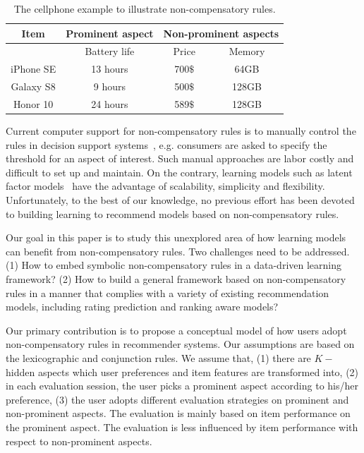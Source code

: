 \documentclass[letterpaper]{article} %
\begin{document}
\begin{table}[htp]
\tiny
\caption{The cellphone example to illustrate non-compensatory rules.}
\begin{center}
\begin{tabular}{|c|c|c|c|}
\hline
Item & Prominent aspect & \multicolumn{2}{|c|}{Non-prominent aspects}\\\hline
& Battery life &  Price & Memory \\\hline
iPhone SE &  13 hours & 700$\$$ & 64GB  \\\hline
Galaxy S8 & 9 hours& 500$\$$  & 128GB \\\hline
Honor 10 & 24 hours& 589$\$$ & 128GB \\\hline
\end{tabular}
\end{center}
\label{tab:example}
\end{table}

Current computer support for non-compensatory rules is to manually control the rules in decision support systems~\cite{Lee2009Transforming}, e.g. consumers are asked to specify the threshold for an aspect of interest. Such manual approaches are labor costly and difficult to set up and maintain. On the contrary, learning models such as latent factor models~\cite{Koren2009Matrix} have the advantage of scalability, simplicity and flexibility. Unfortunately, to the best of our knowledge, no previous effort has been devoted to building learning to recommend models based on non-compensatory rules. 

Our goal in this paper is to study this unexplored area of how learning models can benefit from non-compensatory rules. Two challenges need to be addressed. (1) How to embed symbolic non-compensatory rules in a data-driven learning framework? (2) How to build a general framework based on non-compensatory rules in a manner that complies with a variety of existing recommendation models, including rating prediction and ranking aware models?  

Our primary contribution is to propose a conceptual model of how users adopt non-compensatory rules in recommender systems. Our assumptions are based on the lexicographic and conjunction rules. We assume that, (1) there are $K-$ hidden aspects which  user preferences and item features are transformed into, (2) in each evaluation session, the user picks a prominent aspect according to his/her preference, (3) the user adopts different evaluation strategies on prominent and non-prominent aspects. The evaluation is mainly based on item performance on the prominent aspect. The evaluation is less influenced by item performance with respect to non-prominent aspects.
\end{document}
